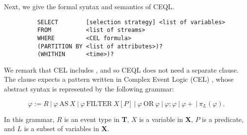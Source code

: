 Next, we give the formal syntax and semantics of CEQL.

\begin{figure}[H]
  \begin{verbatim}
    SELECT        [selection strategy] <list of variables>
    FROM          <list of streams>
    WHERE         <CEL formula>
    (PARTITION BY <list of attributes>)?
    (WHITHIN      <time>)?
  \end{verbatim}
\end{figure}

\vspace{-30pt}
We remark that CEL includes , and so CEQL does not need a separate  clause. The  clause expects a pattern written in Complex Event Logic (CEL) \cite{formal-framework-cer}, whose abstract syntax is represented by the following grammar:

\vspace{-20pt}
\begin{equation*}
  \varphi := R    \ | \ \varphi \ \text{AS} \ X    \ | \    \varphi \ \text{FILTER} \ X[P]  \ | \   \varphi \ \text{OR} \ \varphi   \ | \  \varphi ; \varphi    \ | \  \varphi+ \ | \ \pi_{L}(\varphi).
\end{equation*}

\vspace{-10pt}
In this grammar, $R$ is an event type in \textbf{T}, $X$ is a variable in \textbf{X}, $P$ is a predicate, and $L$ is a subset of variables in \textbf{X}.

